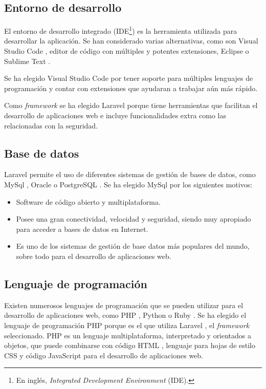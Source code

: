 \subsection{Entorno de desarrollo}
El entorno de desarrollo integrado (IDE\footnote{En inglés, \textit{Integrated Development Environment} (IDE).}) es la herramienta utilizada para desarrollar la aplicación. Se han considerado varias alternativas, como son Visual Studio Code \cite{visualStudioCode}, editor de código con múltiples y potentes extensiones, Eclipse \cite{eclipse} o Sublime Text \cite{sublimeText}.

Se ha elegido Visual Studio Code \cite{visualStudioCode} por tener soporte para múltiples lenguajes de programación y contar con extensiones que ayudaran a trabajar aún más rápido.

Como \textit{framework} se ha elegido Laravel\cite{laravel} porque tiene herramientas que facilitan el desarrollo de aplicaciones web e incluye funcionalidades extra como las relacionadas con la seguridad.

\subsection{Base de datos}\label{sec:bases-de-datos}

Laravel\cite{laravel} permite el uso de diferentes sistemas de gestión de bases de datos, como MySql \cite{mysql}, Oracle \cite{oracle} o PostgreSQL \cite{postgreSQL}. Se ha elegido MySql \cite{mysql} por los siguientes motivos:
\begin{itemize}
    \item Software de código abierto y multiplataforma.
    \item Posee una gran conectividad, velocidad y seguridad, siendo muy apropiado para acceder a bases de datos en Internet.
    \item Es uno de los sistemas de gestión de base datos más populares del mundo, sobre todo para el desarrollo de aplicaciones web.
\end{itemize}


\subsection{Lenguaje de programación}

Existen numerosos lenguajes de programación que se pueden utilizar para el desarrollo de aplicaciones web, como PHP \cite{PHP},  Python \cite{python} o Ruby \cite{ruby}. Se ha elegido el lenguaje de programación PHP \cite{PHP} porque es el que utiliza Laravel \cite{laravel}, el \textit{framework} seleccionado. PHP es un lenguaje multiplataforma, interpretado y orientados a objetos, que puede combinarse con código HTML \cite{html}, lenguaje para hojas de estilo CSS \cite{css} y código JavaScript \cite{javascript} para el desarrollo de aplicaciones web.

    